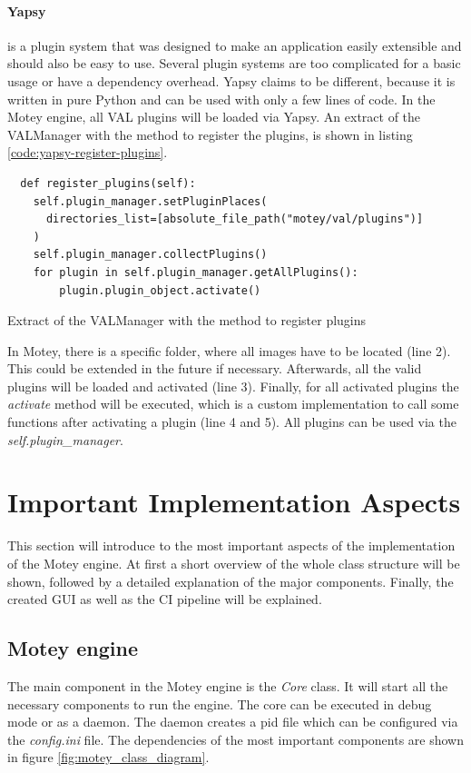 \paragraph{Yapsy} is a plugin system that was designed to make an application easily extensible and should also be easy to use.
Several plugin systems are too complicated for a basic usage or have a dependency overhead.
Yapsy claims to be different, because it is written in pure Python and can be used with only a few lines of code.
In the Motey engine, all \ac{VAL} plugins will be loaded via Yapsy.
An extract of the VALManager with the method to register the plugins, is shown in listing \ref{code:yapsy-register-plugins}.
\begin{listing}[H]
  \begin{verbatim}
  def register_plugins(self):
    self.plugin_manager.setPluginPlaces(
      directories_list=[absolute_file_path("motey/val/plugins")]
    )
    self.plugin_manager.collectPlugins()
    for plugin in self.plugin_manager.getAllPlugins():
        plugin.plugin_object.activate()
  \end{verbatim}
  \caption{Extract of the VALManager with the method to register plugins}
  \label{code:yapsy-register-plugins}
\end{listing}
In Motey, there is a specific folder, where all images have to be located (line 2).
This could be extended in the future if necessary.
Afterwards, all the valid plugins will be loaded and activated (line 3).
Finally, for all activated plugins the \textit{activate} method will be executed, which is a custom implementation to call some functions after activating a plugin (line 4 and 5).
All plugins can be used via the \textit{self.plugin\_manager}.

\section{Important Implementation Aspects}
This section will introduce to the most important aspects of the implementation of the Motey engine.
At first a short overview of the whole class structure will be shown, followed by a detailed explanation of the major components.
Finally, the created \ac{GUI} as well as the \ac{CI} pipeline will be explained.


\subsection{Motey engine}
The main component in the Motey engine is the \textit{Core} class.
It will start all the necessary components to run the engine.
The core can be executed in debug mode or as a daemon.
The daemon creates a pid file which can be configured via the \textit{config.ini} file.
The dependencies of the most important components are shown in figure \ref{fig:motey_class_diagram}.

